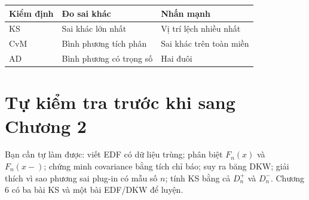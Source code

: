 \begin{center}
\begin{tabular}{lll}
\toprule Kiểm định & Đo sai khác & Nhấn mạnh\\\midrule
KS & Sai khác lớn nhất & Vị trí lệch nhiều nhất\\
CvM & Bình phương tích phân & Sai khác trên toàn miền\\
AD & Bình phương có trọng số & Hai đuôi\\\bottomrule
\end{tabular}
\end{center}

\section{Tự kiểm tra trước khi sang Chương 2}
Bạn cần tự làm được: viết EDF có dữ liệu trùng; phân biệt $F_n(x)$ và
$F_n(x-)$; chứng minh covariance bằng tích chỉ báo; suy ra băng DKW;
giải thích vì sao phương sai plug-in có mẫu số $n$; tính KS bằng cả
$D_n^+$ và $D_n^-$. Chương 6 có ba bài KS và một bài EDF/DKW để luyện.
